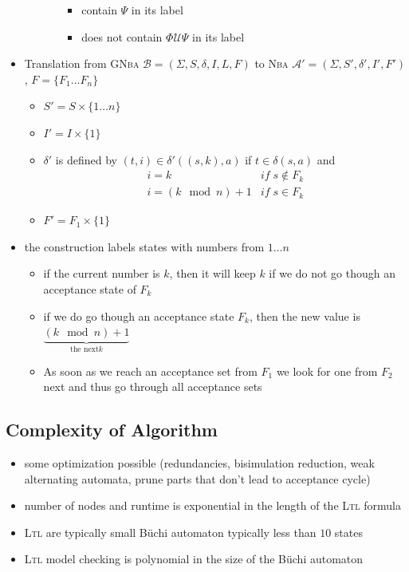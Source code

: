 \documentclass[a4paper, 10pt]{article}
\begin{document}
\begin{itemize}
\begin{itemize}
\begin{itemize}
\begin{itemize}
                \item contain $\Psi$ in its label
                \item does not contain $\Phi \mathcal{U}\Psi$ in its label
            \end{itemize}
        \end{itemize}
    \end{itemize}
    \item Translation from \textsc{GNba} $\mathcal{B}=(\Sigma,S,\delta,I,L,F)$ to \textsc{Nba} $\mathcal{A}'=(\Sigma,S',\delta',I',F')$, $F=\{ F_1\dots F_n \}$
    \begin{itemize}
        \item $S'=S\times\{1\dots n\}$
        \item $I'=I\times\{1\}$
        \item $\delta'$ is defined by $(t,i)\in\delta'((s,k),a)$ if $t\in\delta(s,a)$ and
        \begin{align*}
        i=k             & if\;s\not\in F_k \\
        i=(k \mod n) +1  & if\;s    \in F_k
        \end{align*}
        \item $F'=F_1\times\{1\}$
    \end{itemize}
    \item the construction labels states with numbers from $1\dots n$
    \begin{itemize}
        \item if the current number is $k$, then it will keep $k$ if we do not go though an acceptance state of $F_k$
        \item if we do go though an acceptance state $F_k$, then the new value is $\underset{\textrm{the next} k}{\underbrace{(k \mod n)+1}}$
        \item As soon as we reach an acceptance set from $F_1$ we look for one from $F_2$ next and thus go through all acceptance sets
    \end{itemize}
\end{itemize}
\subsection*{Complexity of Algorithm}
\begin{itemize}
    \item some optimization possible (redundancies, bisimulation reduction, weak alternating automata, prune parts that don't lead to acceptance cycle)
    \item number of nodes and runtime is exponential in the length of the \textsc{Ltl} formula
    \item \textsc{Ltl} are typically small \follows Büchi automaton typically less than $10$ states
    \item \textsc{Ltl} model checking is polynomial in the size of the Büchi automaton
\end{itemize}
\end{document}
